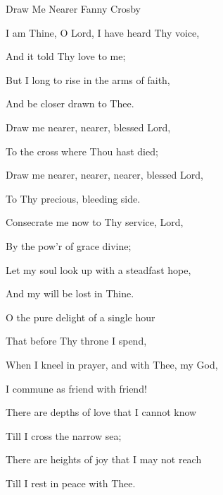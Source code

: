 \documentclass[12pt]{book}
\newcommand{\WBColBrk}{%
  \ifWordBk%
  \newpage%
\fi}
\begin{document}
\begin{song}{Draw Me Nearer}{}
  {\SBPubDom}
  {Fanny Crosby}
  {}
  {}

  \begin{SBVerse}
    I am Thine, O Lord, I have heard Thy voice,

    And it told Thy love to me;

    But I long to rise in the arms of faith,

    And be closer drawn to Thee.
  \end{SBVerse}

  \begin{SBOpGroup}
    Draw me nearer, nearer, blessed Lord,

    To the cross where Thou hast died;

    Draw me nearer, nearer, nearer, blessed Lord,

    To Thy precious, bleeding side.
  \end{SBOpGroup}

  \begin{SBVerse}
    Consecrate me now to Thy service, Lord,

    By the pow'r of grace divine;

    Let my soul look up with a steadfast hope,

    And my will be lost in Thine.
  \end{SBVerse}

  \begin{SBVerse}
    O the pure delight of a single hour

    That before Thy throne I spend,

    When I kneel in prayer, and with Thee, my God,

    I commune as friend with friend!
  \end{SBVerse}

  \begin{SBVerse}
    There are depths of love that I cannot know

    Till I cross the narrow sea;

    There are heights of joy that I may not reach

    Till I rest in peace with Thee.
  \end{SBVerse}
\end{song}

\WBColBrk
\end{document}
